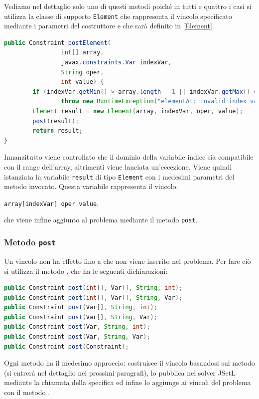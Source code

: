 Vediamo nel dettaglio solo uno di questi metodi poiché in tutti e quattro i casi
si utilizza la classe di supporto \texttt{Element} che rappresenta il vincolo 
specificato mediante i parametri del costruttore e che sarà definito in 
\ref{Element}.

\begin{lstlisting}[language = Java,
                   caption = {\files{postElement}, array di interi.}]
public Constraint postElement(
                int[] array, 
                javax.constraints.Var indexVar, 
                String oper, 
                int value) {
        if (indexVar.getMin() > array.length - 1 || indexVar.getMax() < 0)
                throw new RuntimeException("elementAt: invalid index variable");
        Element result = new Element(array, indexVar, oper, value);
        post(result);
        return result;
}
\end{lstlisting}
Innanzitutto viene controllato che il dominio della variabile indice sia
compatibile con il range dell'array, altrimenti viene lanciata un'eccezione.
Viene quindi istanziata la variabile \texttt{result} di tipo \texttt{Element}
con i medesimi parametri del metodo invocato. Questa variabile rappresenta il
vincolo:
\begin{center}
\lstinline$array[indexVar] oper value$,
\end{center}
che viene infine aggiunto al problema mediante il metodo \texttt{post}.

\subsubsection{Metodo \texttt{post}}
Un vincolo non ha effetto fino a che non viene inserito nel problema. Per 
fare ciò si utilizza il metodo , che ha le seguenti dichiarazioni:
\begin{lstlisting}[language = Java, frame = single]
public Constraint post(int[], Var[], String, int);
public Constraint post(int[], Var[], String, Var);
public Constraint post(Var[], String, int);
public Constraint post(Var[], String, Var);
public Constraint post(Var, String, int);
public Constraint post(Var, String, Var);
public Constraint post(Constraint);
\end{lstlisting}
Ogni metodo  ha il medesimo approccio: costruisce il vincolo 
basandosi sul metodo  (si entrerà
nel dettaglio nei prossimi paragrafi), lo pubblica nel solver JSetL mediante
la chiamata della specifica  ed infine
lo aggiunge ai vincoli del problema con il metodo .

